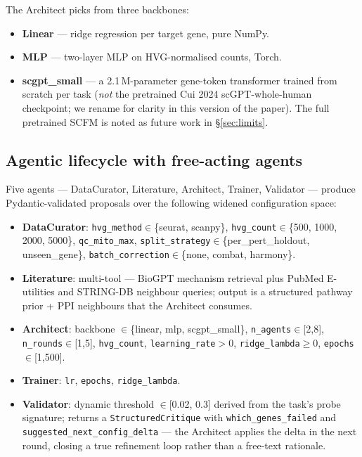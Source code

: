 The Architect picks from three backbones:

\begin{itemize}
  \item \textbf{Linear} — ridge regression per target gene, pure NumPy.
  \item \textbf{MLP} — two-layer MLP on HVG-normalised counts, Torch.
  \item \textbf{scgpt\_small} — a 2.1\,M-parameter gene-token
  transformer trained from scratch per task (\emph{not} the pretrained
  Cui 2024 scGPT-whole-human checkpoint; we rename for clarity in this
  version of the paper). The full pretrained SCFM is noted as future
  work in \S\ref{sec:limits}.
\end{itemize}

\subsection{Agentic lifecycle with free-acting agents}\label{subsec:lifecycle}

Five agents — DataCurator, Literature, Architect, Trainer, Validator
— produce Pydantic-validated proposals over the following widened
configuration space:

\begin{itemize}
  \item \textbf{DataCurator}: \texttt{hvg\_method}$\in$\{seurat, scanpy\},
  \texttt{hvg\_count}$\in$\{500, 1000, 2000, 5000\},
  \texttt{qc\_mito\_max}, \texttt{split\_strategy}$\in$\{per\_pert\_holdout, unseen\_gene\},
  \texttt{batch\_correction}$\in$\{none, combat, harmony\}.
  \item \textbf{Literature}: multi-tool — BioGPT mechanism retrieval plus
  PubMed E-utilities and STRING-DB neighbour queries; output is a
  structured pathway prior + PPI neighbours that the Architect
  consumes.
  \item \textbf{Architect}: backbone $\in$\{linear, mlp, scgpt\_small\},
  \texttt{n\_agents}$\in$[2,8], \texttt{n\_rounds}$\in$[1,5],
  \texttt{hvg\_count}, \texttt{learning\_rate}$>0$,
  \texttt{ridge\_lambda}$\ge 0$, \texttt{epochs}$\in$[1,500].
  \item \textbf{Trainer}: \texttt{lr}, \texttt{epochs},
  \texttt{ridge\_lambda}.
  \item \textbf{Validator}: dynamic threshold $\in$[0.02, 0.3] derived
  from the task's probe signature; returns a
  \texttt{StructuredCritique} with \texttt{which\_genes\_failed} and
  \texttt{suggested\_next\_config\_delta} — the Architect applies the
  delta in the next round, closing a true refinement loop rather than
  a free-text rationale.
\end{itemize}

